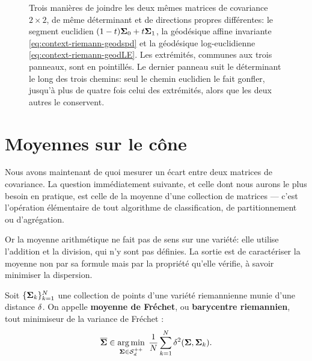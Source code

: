 \begin{figure}[h]
  \begin{center}
    
  \end{center}
  \provInterpolationQR[.5cm]
  \caption{Trois manières de joindre les deux mêmes matrices de covariance
    $2\times 2$, de même déterminant et de directions propres différentes: le
    segment euclidien $(1-t)\boldsymbol{\Sigma}_0+t\boldsymbol{\Sigma}_1$, la géodésique affine invariante
    \cref{eq:context-riemann-geodspd} et la géodésique log-euclidienne
    \cref{eq:context-riemann-geodLE}. Les extrémités, communes aux trois
    panneaux, sont en pointillés. Le dernier panneau suit le déterminant le
    long des trois chemins: seul le chemin euclidien le fait gonfler, jusqu'à
    plus de quatre fois celui des extrémités, alors que les deux autres le
    conservent. \provInterpolation}
  \label{fig:context-riemann-interpolation}
\end{figure}


\section{Moyennes sur le cône}
\label{sec:context-riemann-moyennes}

Nous avons maintenant de quoi mesurer un écart entre deux matrices de covariance. La question immédiatement suivante, et celle dont nous aurons le plus besoin en pratique, est celle de la moyenne d'une collection de matrices --- c'est l'opération élémentaire de tout algorithme de classification, de partitionnement ou d'agrégation.

Or la moyenne arithmétique ne fait pas de sens sur une variété: elle utilise l'addition et la division, qui n'y sont pas définies. La sortie est de caractériser la moyenne non par sa formule mais par la propriété qu'elle vérifie, à savoir minimiser la dispersion.

\begin{definition}
\label{def:context-riemann-frechet}
  Soit $\{\boldsymbol{\Sigma}_k\}_{k=1}^{N}$ une collection de points d'une variété riemannienne munie d'une distance $\delta$. On appelle \textbf{moyenne de Fréchet}, ou \textbf{barycentre riemannien}, tout minimiseur de la variance de Fréchet :
  \begin{equation}
    \overline{\boldsymbol{\Sigma}}
    \in
    \operatorname*{arg\,min}_{\boldsymbol{\Sigma}\in\mathcal{S}_{d}^{++}}
    \;
    \frac{1}{N}\sum_{k=1}^{N}\delta^2(\boldsymbol{\Sigma},\boldsymbol{\Sigma}_k).
    \label{eq:context-riemann-frechet}
  \end{equation}
\end{definition}

